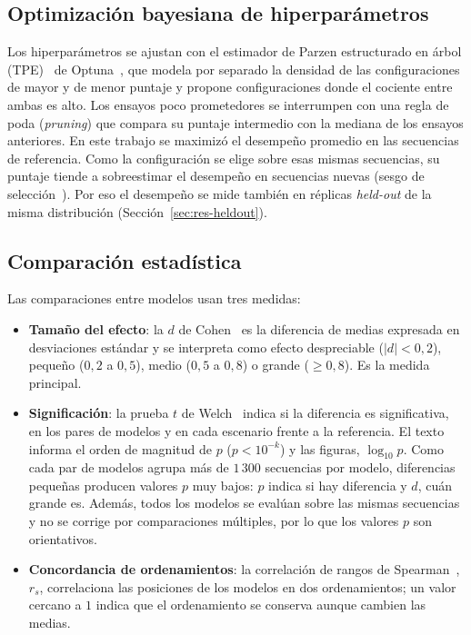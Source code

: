 \documentclass[../00_Main/Main.tex]{subfiles}
\begin{document}
\subsection{Optimizaci\'on bayesiana de hiperpar\'ametros}\label{sec:hpo-bg}

Los hiperpar\'ametros se ajustan con el estimador de Parzen estructurado en \'arbol
(TPE)~\citep{Bergstra2011} de Optuna~\citep{Akiba2019}, que
modela por separado la densidad de las configuraciones de mayor y de
menor puntaje y propone configuraciones donde el cociente entre ambas es
alto. Los ensayos poco prometedores se interrumpen con una regla de
poda (\emph{pruning}) que compara su puntaje intermedio con la mediana de
los ensayos anteriores. En este trabajo se maximiz\'o el desempe\~no
promedio en las secuencias de referencia. Como la configuraci\'on se elige
sobre esas mismas secuencias, su puntaje tiende a sobreestimar el
desempe\~no en secuencias nuevas (sesgo de
selecci\'on~\citep{Cawley2010}). Por eso el desempe\~no se mide tambi\'en
en r\'eplicas \emph{held-out} de la misma distribuci\'on
(Secci\'on~\ref{sec:res-heldout}).

\subsection{Comparaci\'on estad\'istica}\label{sec:stats-bg}

Las comparaciones entre modelos usan tres medidas:

\begin{itemize}
    \item \textbf{Tama\~no del efecto}: la $d$ de Cohen~\citep{Cohen1988}
    es la diferencia de medias expresada en desviaciones est\'andar y se interpreta como
    efecto despreciable ($|d| < 0{,}2$), peque\~no ($0{,}2$ a $0{,}5$),
    medio ($0{,}5$ a $0{,}8$) o grande ($\ge 0{,}8$). Es la medida
    principal.
    \item \textbf{Significaci\'on}: la prueba $t$ de
    Welch~\citep{Welch1947} indica si la diferencia es significativa, en los
    pares de modelos y en cada escenario frente a la referencia. El texto
    informa el orden de magnitud de $p$ ($p < 10^{-k}$) y las figuras,
    $\log_{10} p$. Como cada par de modelos agrupa m\'as de $1\,300$
    secuencias por modelo, diferencias peque\~nas producen valores $p$ muy
    bajos: $p$ indica si hay diferencia y $d$, cu\'an grande es. Adem\'as,
    todos los modelos se eval\'uan sobre las mismas secuencias y no se corrige por
    comparaciones m\'ultiples, por lo que los valores $p$ son
    orientativos.
    \item \textbf{Concordancia de ordenamientos}: la correlaci\'on de
    rangos de Spearman~\citep{Spearman1904}, $r_s$, correlaciona las
    posiciones de los modelos en dos ordenamientos; un valor cercano a $1$ indica que el ordenamiento se conserva aunque
    cambien las medias.
\end{itemize}


\biblio %
\end{document}
